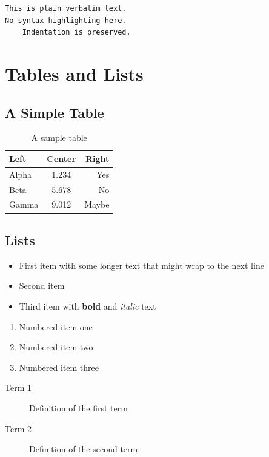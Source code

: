 \documentclass[12pt]{article}
\begin{document}
\begin{verbatim}
This is plain verbatim text.
No syntax highlighting here.
    Indentation is preserved.
\end{verbatim}

\section{Tables and Lists}
\label{sec:tables}

\subsection{A Simple Table}

\begin{table}[h]
\centering
\begin{tabular}{|l|c|r|}
\hline
Left & Center & Right \\
\hline
Alpha & 1.234 & Yes \\
Beta & 5.678 & No \\
Gamma & 9.012 & Maybe \\
\hline
\end{tabular}
\caption{A sample table}
\label{tab:sample}
\end{table}

\subsection{Lists}

\begin{itemize}
\item First item with some longer text that might wrap to the next line
\item Second item
\item Third item with \textbf{bold} and \textit{italic} text
\end{itemize}

\begin{enumerate}
\item Numbered item one
\item Numbered item two
\item Numbered item three
\end{enumerate}

\begin{description}
\item[Term 1] Definition of the first term
\item[Term 2] Definition of the second term
\end{description}
\end{document}
